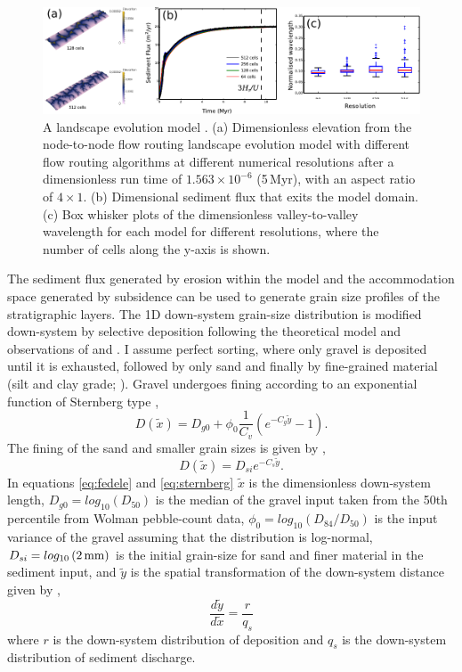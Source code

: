 \begin{figure}
\centering
\includegraphics[width=\textwidth]{./figures/ch2-MFD.pdf}
\caption{A landscape evolution model \citep[see][]{armitage-2019}. (a) Dimensionless elevation from the node-to-node flow routing landscape evolution model with different flow routing algorithms at different numerical resolutions after a dimensionless run time of $1.563\times10^{-6}$ (5\,Myr), with an aspect ratio of $4\times1$. (b) Dimensional sediment flux that exits the model domain. (c) Box whisker plots of the dimensionless valley-to-valley wavelength for each model for different resolutions, where the number of cells along the y-axis is shown.}
\label{fg:MFD}
\end{figure}

The sediment flux generated by erosion within the model and the accommodation space generated by subsidence can be used to generate grain size profiles of the stratigraphic layers. The 1D down-system grain-size distribution is modified down-system by selective deposition following the theoretical model and observations of \cite{fedele-2007} and \cite{duller-etal-2010}. I assume perfect sorting, where only gravel is deposited until it is exhausted, followed by only sand and finally by fine-grained material (silt and clay grade; \citealp{paola-etal-1992}). Gravel undergoes fining according to an exponential function of Sternberg type \citep{fedele-2007,duller-etal-2010},
\begin{equation}
D(\tilde{x}) = D_{g0} + \phi_{0}\frac{1}{C_{v}}\left( e^{-C_{g}\tilde{y}}-1 \right).
\label{eq-fedele}
\end{equation}
The fining of the sand and smaller grain sizes is given by \cite{sternberg-1875},
\begin{equation}
D(\tilde{x}) = D_{si}e^{-C_{s}\tilde{y}}.
\label{eq-sternberg}
\end{equation}
In equations \ref{eq:fedele} and \ref{eq:sternberg} $\tilde{x}$ is the dimensionless down-system length, $D_{g0} = log_{10}\left(D_{50}\right)$ is the median of the gravel input taken from the 50th percentile from Wolman pebble-count data, $\phi_{0} = log_{10}\left( D_{84}/D_{50} \right)$ is the input variance of the gravel assuming that the distribution is log-normal, $D_{si} = log_{10}\left( 2\,{\rm mm} \right)$ is the initial grain-size for sand and finer material in the sediment input, and $\tilde{y}$ is the spatial transformation of the down-system distance given by \citep{paola-1995},
\begin{equation}
\frac{d\tilde{y}}{d\tilde{x}} = \frac{r}{q_{s}}
\end{equation}
where $r$ is the down-system distribution of deposition and $q_{s}$ is the down-system distribution of sediment discharge.


